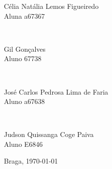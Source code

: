 \begin{titlepage}
\begin{center}
\begin{minipage}{0.4\textwidth}
		\large Célia Natália Lemos Figueiredo\\
           Aluna a67367
\end{minipage}
\\[1cm]
\begin{minipage}{0.4\textwidth}
		\large Gil Gonçalves \\
           Aluno 67738\\
\end{minipage}
\\[1cm]
\begin{minipage}{0.4\textwidth}
		\large José Carlos Pedrosa Lima de Faria\\
		Aluno  a67638
\end{minipage}
\\[1cm]
\begin{minipage}{0.4\textwidth}
	\large Judson Quissanga Coge Paiva\\
	Aluno  E6846
\end{minipage}


\vfill

\large Braga, {\large \today}

\end{center}
\end{titlepage}
